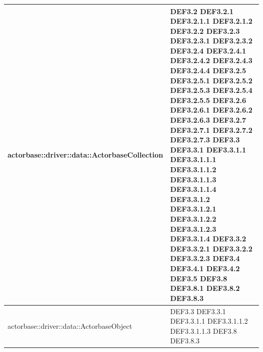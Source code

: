 \documentclass{scalatekids-article}
\begin{document}
\begin{longtable}[H]{|p{12cm}|p{5.5cm}|}
actorbase::driver::data::ActorbaseCollection & \multiLineCell[t]{DEF3.2 DEF3.2.1\\DEF3.2.1.1 DEF3.2.1.2\\DEF3.2.2 DEF3.2.3\\DEF3.2.3.1 DEF3.2.3.2\\DEF3.2.4 DEF3.2.4.1\\DEF3.2.4.2 DEF3.2.4.3\\DEF3.2.4.4 DEF3.2.5\\DEF3.2.5.1 DEF3.2.5.2\\DEF3.2.5.3 DEF3.2.5.4\\DEF3.2.5.5 DEF3.2.6\\DEF3.2.6.1 DEF3.2.6.2\\DEF3.2.6.3 DEF3.2.7\\DEF3.2.7.1 DEF3.2.7.2\\DEF3.2.7.3 DEF3.3\\DEF3.3.1 DEF3.3.1.1\\DEF3.3.1.1.1 DEF3.3.1.1.2\\DEF3.3.1.1.3 DEF3.3.1.1.4\\DEF3.3.1.2 DEF3.3.1.2.1\\DEF3.3.1.2.2 DEF3.3.1.2.3\\DEF3.3.1.4 DEF3.3.2\\DEF3.3.2.1 DEF3.3.2.2\\DEF3.3.2.3 DEF3.4\\DEF3.4.1 DEF3.4.2\\DEF3.5 DEF3.8\\DEF3.8.1 DEF3.8.2\\DEF3.8.3}\\
\hline
actorbase::driver::data::ActorbaseObject & \multiLineCell[t]{DEF3.3 DEF3.3.1\\DEF3.3.1.1 DEF3.3.1.1.2\\DEF3.3.1.1.3 DEF3.8\\DEF3.8.3}\\
\hline

\end{longtable}
\end{document}
